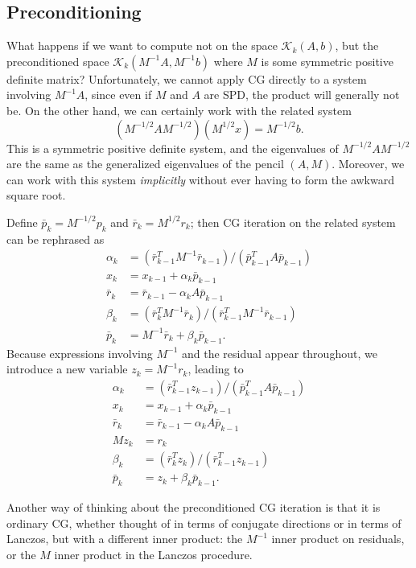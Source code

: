 \subsection{Preconditioning}

What happens if we want to compute not on the space $\mathcal{K}_k(A,b)$,
but the preconditioned space $\mathcal{K}_k(M^{-1} A, M^{-1} b)$
where $M$ is some symmetric positive definite matrix?  Unfortunately,
we cannot apply CG directly to a system involving $M^{-1} A$, since
even if $M$ and $A$ are SPD, the product will generally not be.
On the other hand, we can certainly work with the related system
\[
  (M^{-1/2} A M^{-1/2}) (M^{1/2} x) = M^{-1/2} b.
\]
This is a symmetric positive definite system, and the eigenvalues
of $M^{-1/2} A M^{-1/2}$ are the same as the generalized eigenvalues
of the pencil $(A,M)$.  Moreover, we can work with this system
{\em implicitly} without ever having to form the awkward square
root.

Define $\bar{p}_k = M^{-1/2} p_k$ and $\bar{r}_k = M^{1/2} r_k$;
then CG iteration on the related system can be rephrased as
\begin{align*}
  \alpha_k &= (\bar{r}_{k-1}^T M^{-1} \bar{r}_{k-1})/(\bar{p}_{k-1}^T A \bar{p}_{k-1}) \\
  x_{k} &= x_{k-1} + \alpha_k \bar{p}_{k-1} \\
  \bar{r}_{k} &= \bar{r}_{k-1} - \alpha_k A \bar{p}_{k-1} \\
  \beta_{k} &= (\bar{r}_k^T M^{-1} \bar{r}_k)/(\bar{r}_{k-1}^T M^{-1} \bar{r}_{k-1}) \\
  \bar{p}_k &= M^{-1} \bar{r}_{k} + \beta_k \bar{p}_{k-1}.
\end{align*}
Because expressions involving $M^{-1}$ and the residual appear throughout,
we introduce a new variable $z_k = M^{-1} r_k$, leading to
\begin{align*}
  \alpha_k &= (\bar{r}_{k-1}^T z_{k-1})/(\bar{p}_{k-1}^T A \bar{p}_{k-1}) \\
  x_{k} &= x_{k-1} + \alpha_k \bar{p}_{k-1} \\
  \bar{r}_{k} &= \bar{r}_{k-1} - \alpha_k A \bar{p}_{k-1} \\
  M z_{k} &= r_k \\
  \beta_{k} &= (\bar{r}_k^T z_k)/(\bar{r}_{k-1}^T z_{k-1}) \\
  \bar{p}_k &= z_{k} + \beta_k \bar{p}_{k-1}.
\end{align*}

Another way of thinking about the preconditioned CG iteration is
that it is ordinary CG, whether thought of in terms of conjugate
directions or in terms of Lanczos, but with a different inner
product: the $M^{-1}$ inner product on residuals, or the $M$ inner
product in the Lanczos procedure.

